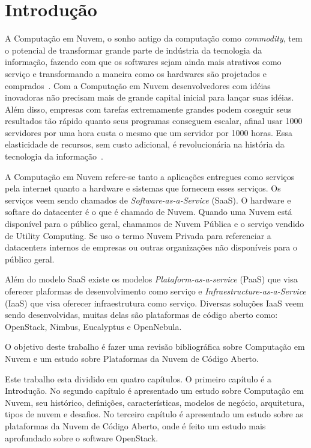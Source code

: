 \chapter{Introdução}

A Computação em Nuvem, o sonho antigo da computação como \emph{commodity}, tem o potencial de transformar grande parte de indústria da tecnologia da informação, fazendo com que os softwares sejam ainda mais atrativos como serviço e transformando a maneira como os hardwares são projetados e comprados~\cite{Armbrust:2009}. Com a Computação em Nuvem desenvolvedores com idéias inovadoras não precisam mais de grande capital inicial para lançar suas idéias. Além disso, empresas com tarefas extremamente grandes podem coseguir seus resultados tão rápido quanto seus programas conseguem escalar, afinal usar 1000 servidores por uma hora custa o mesmo que um servidor por 1000 horas. Essa elasticidade de recursos, sem custo adicional, é revolucionária na história da tecnologia da informação~\cite{Armbrust:2009}.

A Computação em Nuvem refere-se tanto a aplicações entregues como serviços pela internet quanto a hardware e sistemas que fornecem esses serviços. Os serviços veem sendo chamados de \textit{Software-as-a-Service} (SaaS). O hardware e softare do datacenter é o que é chamado de Nuvem. Quando uma Nuvem está disponível para o público geral, chamamos de Nuvem Pública e o serviço vendido de Utility Computing. Se uso o termo Nuvem Privada para referenciar a datacenters internos de empresas ou outras organizações não disponíveis para o público geral. 

Além do modelo SaaS existe os modelos \textit{Plataform-as-a-service} (PaaS) que visa oferecer plaformas de desenvolvimento como serviço e \textit{Infraestructure-as-a-Service} (IaaS) que visa oferecer infraestrutura como serviço. Diversas soluções IaaS veem sendo desenvolvidas, muitas delas são plataformas de código aberto como: OpenStack, Nimbus, Eucalyptus e OpenNebula.

O objetivo deste trabalho é fazer uma revisão bibliográfica sobre Computação em Nuvem e um estudo sobre Plataformas da Nuvem de Código Aberto. 


Este trabalho esta dividido em quatro capítulos. O primeiro capítulo é a Introdução. No segundo capítulo é apresentado um estudo sobre Computação em Nuvem, seu histórico, definições, características, modelos de negócio, arquitetura, tipos de nuvem e desafios. No terceiro capítulo é apresentado um estudo sobre as plataformas da Nuvem de Código Aberto, onde é feito um estudo mais aprofundado sobre o software OpenStack.
